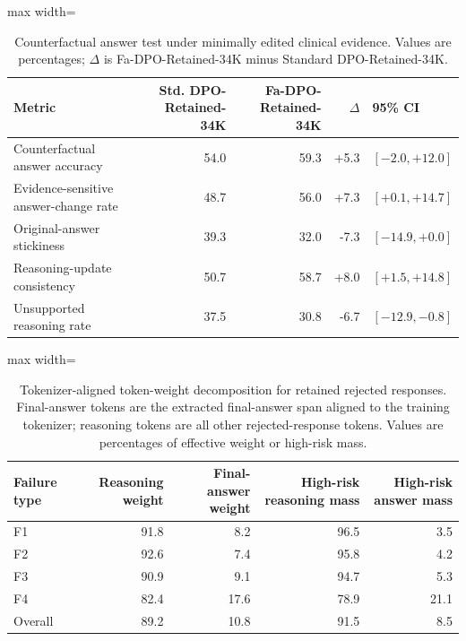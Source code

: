 \documentclass[a4paper,fleqn,doubleblind]{cas-sc}
\begin{document}
\begin{table}[htbp]
    \centering
    \footnotesize
    \caption{Counterfactual answer test under minimally edited clinical evidence. Values are percentages; $\Delta$ is Fa-DPO-Retained-34K minus Standard DPO-Retained-34K.}
    \label{tab:counterfactual_answer_test}
    \begin{adjustbox}{max width=\columnwidth}
    \begin{tabular}{lrrrl}
        \toprule
        \textbf{Metric} & \textbf{Std. DPO-Retained-34K} & \textbf{Fa-DPO-Retained-34K} & \textbf{$\Delta$} & \textbf{95\% CI} \\
        \midrule
        Counterfactual answer accuracy & 54.0 & 59.3 & +5.3 & $[-2.0,+12.0]$ \\
        Evidence-sensitive answer-change rate & 48.7 & 56.0 & +7.3 & $[+0.1,+14.7]$ \\
        Original-answer stickiness & 39.3 & 32.0 & -7.3 & $[-14.9,+0.0]$ \\
        Reasoning-update consistency & 50.7 & 58.7 & +8.0 & $[+1.5,+14.8]$ \\
        Unsupported reasoning rate & 37.5 & 30.8 & -6.7 & $[-12.9,-0.8]$ \\
        \bottomrule
    \end{tabular}
    \end{adjustbox}
\end{table}

\begin{table}[htbp]
    \centering
    \footnotesize
    \caption{Tokenizer-aligned token-weight decomposition for retained rejected responses. Final-answer tokens are the extracted final-answer span aligned to the training tokenizer; reasoning tokens are all other rejected-response tokens. Values are percentages of effective weight or high-risk mass.}
    \label{tab:answer_token_weight_decomposition}
    \begin{adjustbox}{max width=\textwidth}
    \begin{tabular}{lrrrr}
        \toprule
        \textbf{Failure type} & \textbf{Reasoning weight} & \textbf{Final-answer weight} & \textbf{High-risk reasoning mass} & \textbf{High-risk answer mass} \\
        \midrule
        F1 & 91.8 & 8.2 & 96.5 & 3.5 \\
        F2 & 92.6 & 7.4 & 95.8 & 4.2 \\
        F3 & 90.9 & 9.1 & 94.7 & 5.3 \\
        F4 & 82.4 & 17.6 & 78.9 & 21.1 \\
        \midrule
        Overall & 89.2 & 10.8 & 91.5 & 8.5 \\
        \bottomrule
    \end{tabular}
    \end{adjustbox}
\end{table}
\end{document}
